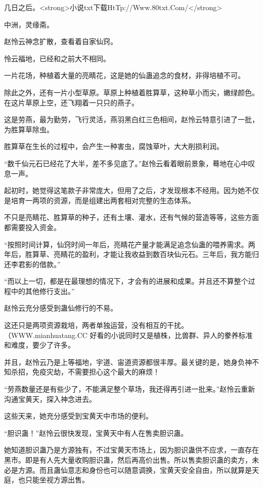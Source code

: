 
\begin{this_body}

几日之后。<strong>小说txt下载HtTp://Www.80txt.Com/</strong>

中洲，灵缘斋。

赵怜云神念扩散，查看着自家仙窍。

怜云福地，已经和之前大不相同。

一片花场，种植着大量的亮睛花，这是她的仙蛊追念的食材，非得培植不可。

除此之外，还有一片小型草原。草原上种植着胜算草，这种草小而尖，嫩绿颜色。在这片草原上空，还飞翔着一只只的燕子。

这是劳燕，最为勤劳，飞行灵活，燕羽黑白红三色相间，赵怜云特意引进了一批，为胜算草除虫。

胜算草在生长的过程中，会产生一种害虫，腐蚀草叶，大大削损利润。

“数千仙元石已经花了大半，差不多见底了。”赵怜云看着眼前景象，蓦地在心中叹息一声。

起初时，她觉得这笔款子非常庞大，但用了之后，才发现根本不经用。因为她不仅是培育一两项的资源，而是组建出两套相对完整的生态体系。

不只是亮睛花、胜算草的种子，还有土壤、灌水，还有气候的营造等等，这些方面都需要投入资金。

“按照时间计算，仙窍时间一年后，亮睛花产量才能满足追念仙蛊的喂养需求。两年后，胜算草、亮睛花的盈利，才能让我收益到数百块仙元石。三年后，我方能归还李君影的借款。”

“而以上一切，都是在最理想的情况下，才会有的进展和成果。并且还不算整个过程中的其他修行支出。”

赵怜云充分感受到蛊仙修行的不易。

这还只是两项资源栽培，两者单独运营，没有相互的干扰。（WWW.mianhuatang.CC 好看的小说同时又是植株，比兽群、异人的豢养标准和难度，要少了许多。

并且，赵怜云乃是上等福地，宇道、宙道资源都很丰厚。最关键的是，她身负神不知杀招，免疫灾劫，不需要担心这个最大的麻烦！

“劳燕数量还是有些少了，不能满足整个草场，我还得再引进一批来。”赵怜云重新沟通宝黄天，探入神念进去。

这些天来，她充分感受到宝黄天中市场的便利。

“胆识蛊！”赵怜云很快发现，宝黄天中有人在售卖胆识蛊。

她知道胆识蛊乃是方源独有，不过宝黄天市场上，因为胆识蛊供不应求，一直存在黑市。即是有人先大量收购胆识蛊，然后再高价出售。所以售卖胆识蛊的卖方，未必是方源。而且蛊仙意志和身份也可以随意调换，宝黄天安全自由，所以就算是天庭，也只能坐视方源出售。


\end{this_body}
